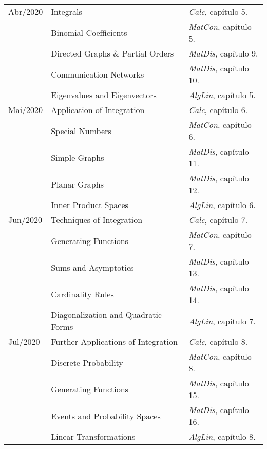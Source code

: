 \documentclass[a4paper]{inzane_syllabus} %
\begin{document}
\begin{center}
\begin{tabularx}{\textwidth}{p{2cm}p{8cm}p{9.5cm}}
\arrayrulecolor{maingray}\hline
Abr/2020 & Integrals                          & \emph{Calc},   capítulo 5.  \\
         & Binomial Coefficients              & \emph{MatCon}, capítulo 5.  \\
         & Directed Graphs \& Partial Orders  & \emph{MatDis}, capítulo 9.  \\
         & Communication Networks             & \emph{MatDis}, capítulo 10. \\
         & Eigenvalues and Eigenvectors       & \emph{AlgLin}, capítulo 5.  \\

\arrayrulecolor{maingray}\hline
Mai/2020 & Application of Integration  & \emph{Calc},   capítulo 6.  \\
         & Special Numbers             & \emph{MatCon}, capítulo 6.  \\
         & Simple Graphs               & \emph{MatDis}, capítulo 11. \\
         & Planar Graphs               & \emph{MatDis}, capítulo 12. \\
         & Inner Product Spaces        & \emph{AlgLin}, capítulo 6.  \\

\arrayrulecolor{maingray}\hline
Jun/2020 & Techniques of Integration            & \emph{Calc},   capítulo 7.  \\
         & Generating Functions                 & \emph{MatCon}, capítulo 7.  \\
         & Sums and Asymptotics                 & \emph{MatDis}, capítulo 13. \\
         & Cardinality Rules                    & \emph{MatDis}, capítulo 14. \\
         & Diagonalization and Quadratic Forms  & \emph{AlgLin}, capítulo 7.  \\

\arrayrulecolor{maingray}\hline
Jul/2020 & Further Applications of Integration  & \emph{Calc},   capítulo 8.  \\
         & Discrete Probability                 & \emph{MatCon}, capítulo 8.  \\
         & Generating Functions                 & \emph{MatDis}, capítulo 15. \\
         & Events and Probability Spaces        & \emph{MatDis}, capítulo 16. \\
         & Linear Transformations               & \emph{AlgLin}, capítulo 8.  \\


\end{tabularx}
\end{center}
\end{document}
